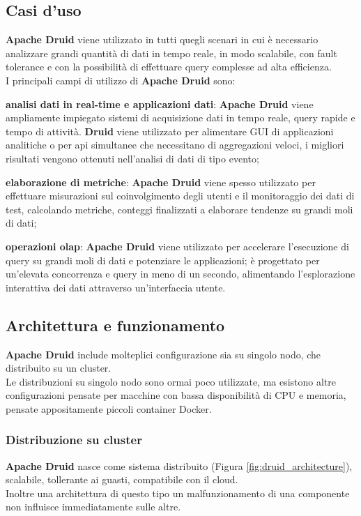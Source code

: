 \subsection{Casi d'uso}
\textbf{Apache Druid} viene utilizzato in tutti quegli scenari in cui è necessario analizzare grandi quantità di dati in tempo reale, in modo scalabile, con \gls{fault tolerance}{} e con la possibilità di effettuare query complesse ad alta efficienza.\\  
I principali campi di utilizzo di \textbf{Apache Druid} sono:
\begin{list}{*}
    \item \textbf{analisi dati in real-time e applicazioni dati}: \textbf{Apache Druid} viene ampliamente impiegato sistemi di acquisizione dati in
    tempo reale, query rapide e tempo di attività. \textbf{Druid} viene utilizzato per alimentare GUI
    di applicazioni analitiche o per \gls{api}{} simultanee che necessitano di aggregazioni veloci, i migliori risultati 
    vengono ottenuti nell'analisi di dati di tipo evento;
    \item \item \textbf{elaborazione di metriche}: \textbf{Apache Druid} viene spesso utilizzato per effettuare misurazioni sul coinvolgimento degli
    utenti e il monitoraggio dei dati di test, calcolando metriche, conteggi finalizzati a elaborare tendenze su grandi moli di dati;
    \item \textbf{operazioni \gls{olap}{}}: \textbf{Apache Druid} viene utilizzato per accelerare l’esecuzione di query su grandi moli di dati e potenziare le applicazioni; è progettato per un’elevata concorrenza e query in meno di un secondo, alimentando
    l’esplorazione interattiva dei dati attraverso un’interfaccia utente.
\end{list}
\subsection{Architettura e funzionamento}
\textbf{Apache Druid} include molteplici configurazione sia su singolo nodo, che distribuito su un \gls{cluster}{}.\\
Le distribuzioni su singolo nodo sono ormai poco utilizzate, ma esistono altre configurazioni pensate per macchine con bassa disponibilità di 
CPU e memoria, pensate appositamente piccoli \gls{container}{} \gls{Docker}{}. 
\subsubsection{Distribuzione su cluster}
\textbf{Apache Druid} nasce come sistema distribuito (Figura \ref{fig:druid_architecture}), scalabile, tollerante ai guasti, compatibile con il cloud. \\
Inoltre una architettura di questo tipo un malfunzionamento di una componente non influisce immediatamente sulle altre.\\

